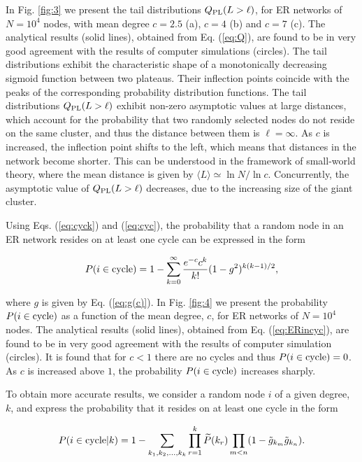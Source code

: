 \documentclass[preprint,pre,superscriptaddress,showpacs]{revtex4}
\begin{document}
In Fig. \ref{fig:3} 
we present the tail distributions
$Q_{\rm PL}(L>\ell)$,
for ER networks of $N=10^4$ nodes, 
with mean degree $c=2.5$ (a), $c=4$ (b) and $c=7$ (c).
The analytical results (solid lines),
obtained from Eq. (\ref{eq:Q}), 
are found to be in very good agreement
with the results of computer simulations (circles).
The tail distributions exhibit the characteristic shape of a monotonically
decreasing sigmoid function between two plateaus.
Their inflection points coincide with the peaks of the corresponding
probability distribution functions.
The tail distributions
$Q_{\rm PL}(L>\ell)$ 
exhibit non-zero asymptotic values
at large distances, which account for the probability that
two randomly selected nodes do not reside on the same cluster,
and thus the distance between them is $\ell = \infty$.
As $c$ is increased, the inflection point
shifts to the left, which means that distances in the network become shorter.
This can be understood in the framework of small-world theory, where
the mean distance is given by 
$\langle L \rangle \simeq \ln N / \ln c$.
Concurrently, the asymptotic value of
$Q_{\rm PL}(L>\ell)$ decreases,
due to the increasing size of the giant cluster.

Using Eqs. 
(\ref{eq:cyck})
and
(\ref{eq:cyc}),
the probability that a random node in an ER network
resides on at least one cycle can be expressed in the form

\begin{equation}
P(i \in {\rm cycle}) = 1 - \sum_{k=0}^{\infty}
\frac{e^{-c} c^k}{k!} (1-g^2)^{k(k-1)/2},
\label{eq:ERincyc}
\end{equation}

\noindent
where $g$ is given by Eq. (\ref{eq:g(c)}).
In Fig. \ref{fig:4} 
we present the probability
$P(i \in {\rm cycle})$
as a function of the mean degree, $c$,
for ER networks of $N=10^4$ nodes.
The analytical results (solid lines), 
obtained from Eq. 
(\ref{eq:ERincyc}),
are found to be in very good agreement 
with the results of computer simulation
(circles).
It is found that for $c<1$ there are no cycles
and thus 
$P(i \in {\rm cycle})=0$.
As $c$ is increased above $1$, the probability
$P(i \in {\rm cycle})$
increases sharply.


To obtain more accurate results, 
we consider a random node $i$ of a given degree, $k$,
and express the probability that it resides on at least
one cycle in the form

\begin{equation}
P(i \in {\rm cycle} |k) =
1 -
\sum_{k_1,k_2,\dots,k_k} \prod_{r=1}^k
\widetilde P(k_r)
\prod_{m<n} ( 1 - \tilde g_{k_m} \tilde g_{k_n} ).
\end{equation}
\end{document}
